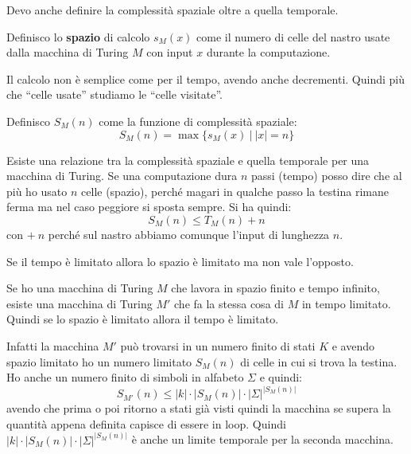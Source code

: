 Devo anche definire la complessità spaziale oltre a quella temporale.
\begin{definizione}
     Definisco lo \textbf{spazio} di calcolo $s_M(x)$ come il numero di celle del nastro usate dalla macchina di Turing $M$ con input $x$ durante la computazione.
     
     Il calcolo non è semplice come per il tempo, avendo anche decrementi. Quindi più che “celle usate” studiamo le “celle visitate”.
\end{definizione}
\begin{definizione}
    Definisco $S_M(n)$ come la funzione di complessità spaziale:
    \begin{equation}
        S_M(n) =  \max\{s_M(x)\ |\  |x| = n\}
    \end{equation}
\end{definizione}

Esiste una relazione tra la complessità spaziale e quella temporale per una macchina di Turing. Se una computazione dura $n$ passi (tempo) posso dire che al più ho usato $n$ celle (spazio), perché magari in qualche passo la testina rimane ferma ma nel caso peggiore si sposta sempre. Si ha quindi:
\begin{equation}
    S_M(n) \leq T_M(n) + n
\end{equation}
con $+ \ n$ perché sul nastro abbiamo comunque l'input di lunghezza $n$.

\begin{teorema}
    Se il tempo è limitato allora lo spazio è limitato ma non vale l'opposto.     
\end{teorema}
\begin{teorema}
    Se ho una macchina di Turing $M$ che lavora in spazio finito e tempo infinito, esiste una macchina di Turing $M'$ che fa la stessa cosa di $M$ in tempo limitato. Quindi se lo spazio è limitato allora il tempo è limitato.
\end{teorema}
\begin{dimostrazione}
    Infatti la macchina $M'$ può trovarsi in un numero finito di stati $K$ e avendo spazio limitato ho un numero limitato $S_M(n)$ di celle in cui si trova la testina. Ho anche un numero finito di simboli in alfabeto $\Sigma$ e quindi:
    \begin{equation}
        S_{M'}(n) \leq |k| \cdot |S_M(n)| \cdot |\Sigma|^{|S_M(n)|}
    \end{equation}
    avendo che prima o poi ritorno a stati già visti quindi la macchina se supera la quantità appena definita capisce di essere in loop. Quindi $|k| \cdot |S_M(n)| \cdot |\Sigma|^{|S_M(n)|}$ è anche un limite temporale per la seconda macchina.
\end{dimostrazione}

